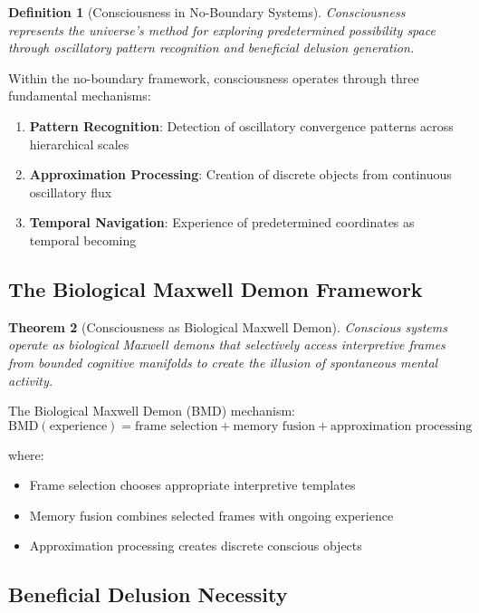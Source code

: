 \documentclass[11pt,a4paper]{article}
\newtheorem{theorem}{Theorem}[section]
\newtheorem{definition}[theorem]{Definition}
\theoremstyle{remark}
\begin{document}
\begin{definition}[Consciousness in No-Boundary Systems]
Consciousness represents the universe's method for exploring predetermined possibility space through oscillatory pattern recognition and beneficial delusion generation.
\end{definition}

Within the no-boundary framework, consciousness operates through three fundamental mechanisms:

\begin{enumerate}
\item \textbf{Pattern Recognition}: Detection of oscillatory convergence patterns across hierarchical scales
\item \textbf{Approximation Processing}: Creation of discrete objects from continuous oscillatory flux
\item \textbf{Temporal Navigation}: Experience of predetermined coordinates as temporal becoming
\end{enumerate}

\subsection{The Biological Maxwell Demon Framework}

\begin{theorem}[Consciousness as Biological Maxwell Demon]
Conscious systems operate as biological Maxwell demons that selectively access interpretive frames from bounded cognitive manifolds to create the illusion of spontaneous mental activity.
\end{theorem}

The Biological Maxwell Demon (BMD) mechanism:
\begin{equation}
\text{BMD}(\text{experience}) = \text{frame selection} + \text{memory fusion} + \text{approximation processing}
\end{equation}

where:
\begin{itemize}
\item Frame selection chooses appropriate interpretive templates
\item Memory fusion combines selected frames with ongoing experience  
\item Approximation processing creates discrete conscious objects
\end{itemize}

\subsection{Beneficial Delusion Necessity}
\end{document}
